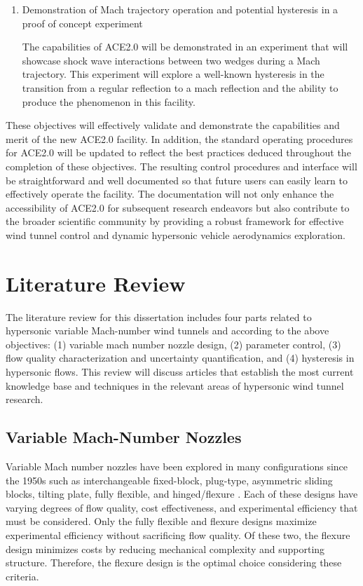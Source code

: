 \begin{enumerate}[listparindent=\parindent]
    \item Demonstration of Mach trajectory operation and potential hysteresis in a proof of concept experiment

        The capabilities of ACE2.0 will be demonstrated in an experiment that will showcase shock wave interactions between two wedges during a Mach trajectory. This experiment will explore a well-known hysteresis in the transition from a regular reflection to a mach reflection and the ability to produce the phenomenon in this facility. 

\end{enumerate}

These objectives will effectively validate and demonstrate the capabilities and merit of the new ACE2.0 facility. In addition, the standard operating procedures for ACE2.0 will be updated to reflect the best practices deduced throughout the completion of these objectives. The resulting control procedures and interface will be straightforward and well documented so that future users can easily learn to effectively operate the facility. The documentation will not only enhance the accessibility of ACE2.0 for subsequent research endeavors but also contribute to the broader scientific community by providing a robust framework for effective wind tunnel control and dynamic hypersonic vehicle aerodynamics exploration.

\section{Literature Review}

The literature review for this dissertation includes four parts related to hypersonic variable Mach-number wind tunnels and according to the above objectives: (1) variable mach number nozzle design, (2) parameter control, (3) flow quality characterization and uncertainty quantification, and (4) hysteresis in hypersonic flows. This review will discuss articles that establish the most current knowledge base and techniques in the relevant areas of hypersonic wind tunnel research.

\subsection{Variable Mach-Number Nozzles}
Variable Mach number nozzles have been explored in many configurations since the 1950s such as interchangeable fixed-block, plug-type, asymmetric sliding blocks, tilting plate, fully flexible, and hinged/flexure \cite{agard-ag-3}. Each of these designs have varying degrees of flow quality, cost effectiveness, and experimental efficiency that must be considered. Only the fully flexible and flexure designs maximize experimental efficiency without sacrificing flow quality. Of these two, the flexure design minimizes costs by reducing mechanical complexity and supporting structure. Therefore, the flexure design is the optimal choice considering these criteria.

